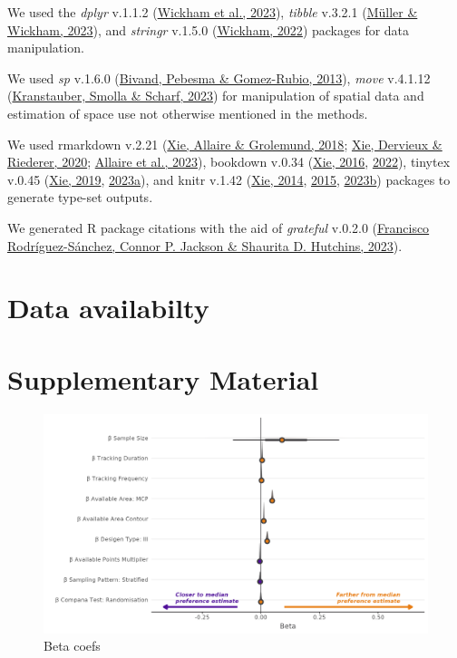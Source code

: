 \documentclass[10pt,a4paper]{article}
\begin{document}
We used the \emph{dplyr} v.1.1.2 (\protect\hyperlink{ref-dplyr}{Wickham et al., 2023}), \emph{tibble} v.3.2.1 (\protect\hyperlink{ref-tibble}{Müller \& Wickham, 2023}),
and \emph{stringr} v.1.5.0 (\protect\hyperlink{ref-stringr}{Wickham, 2022}) packages for data manipulation.

We used \emph{sp} v.1.6.0 (\protect\hyperlink{ref-sp}{Bivand, Pebesma \& Gomez-Rubio, 2013}), \emph{move} v.4.1.12 (\protect\hyperlink{ref-move}{Kranstauber, Smolla \& Scharf, 2023}) for manipulation of spatial data and estimation of space use not otherwise mentioned in the methods.

We used rmarkdown v.2.21 (\protect\hyperlink{ref-rmarkdown2018}{Xie, Allaire \& Grolemund, 2018}; \protect\hyperlink{ref-rmarkdown2020}{Xie, Dervieux \& Riederer, 2020}; \protect\hyperlink{ref-rmarkdown2023}{Allaire et al., 2023}), bookdown v.0.34 (\protect\hyperlink{ref-bookdown2016}{Xie, 2016}, \protect\hyperlink{ref-R-bookdown}{2022}), tinytex v.0.45 (\protect\hyperlink{ref-tinytex2019}{Xie, 2019}, \protect\hyperlink{ref-tinytex2023}{2023a}), and knitr v.1.42 (\protect\hyperlink{ref-knitr2014}{Xie, 2014}, \protect\hyperlink{ref-knitr2015}{2015}, \protect\hyperlink{ref-knitr2023}{2023b}) packages to generate type-set outputs.

We generated R package citations with the aid of \emph{grateful} v.0.2.0 (\protect\hyperlink{ref-grateful}{Francisco Rodríguez-Sánchez, Connor P. Jackson \& Shaurita D. Hutchins, 2023}).

\hypertarget{data-availabilty}{%
\section{Data availabilty}\label{data-availabilty}}

\clearpage

\hypertarget{supplementary-material}{%
\section{Supplementary Material}\label{supplementary-material}}

\begin{figure}
\includegraphics[width=1\linewidth]{../figures/areaBrms_effectsPlot} \caption{Beta coefs}\label{fig:effectPlotArea}
\end{figure}
\end{document}
